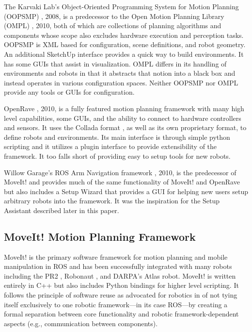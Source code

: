 \documentclass[10pt,journal,compsoc]{joser1}
\begin{document}
{The Karvaki Lab's Object-Oriented Programming System for Motion Planning (OOPSMP) \cite{oopsmp}, 2008, is a predecessor to the Open Motion Planning Library (OMPL) \cite{sucan2012the-open-motion-planning-library}, 2010, both of which are collections of planning algorithms and components whose scope also excludes hardware execution and perception tasks. OOPSMP is XML based for configuration, scene definitions, and robot geometry. An additional SketchUp interface provides a quick way to build environments. It has some GUIs that assist in visualization. OMPL differs in its handling of environments and robots in that it abstracts that notion into a black box and instead operates in various configuration spaces. Neither OOPSMP nor OMPL provide any tools or GUIs for configuration.

OpenRave  \cite{diankov2008openrave}, 2010, is a fully featured motion planning framework with many high level capabilities, some GUIs, and the ability to connect to hardware controllers and sensors. It uses the Collada format \cite{collada}, as well as its own proprietary format, to define robots and environments. Its main interface is through simple python scripting and it utilizes a plugin interface to provide extensibility of the framework. It too falls short of providing easy to setup tools for new robots. 

Willow Garage's ROS Arm Navigation framework \cite{chitta2012perception}, 2010, is the predecessor of MoveIt! and provides much of the same functionality of MoveIt! and OpenRave but also includes a Setup Wizard that provides a GUI for helping new users setup arbitrary robots into the framework. It was the inspiration for the Setup Assistant described later in this paper.
\subsection{MoveIt! Motion Planning Framework}
\label{sec::moveit}

MoveIt!\cite{moveit} is the primary software framework for motion planning and mobile manipulation in ROS and has been successfully integrated with many robots including the PR2 \cite{wyrobek2008towards}, Robonaut \cite{ambrose2000robonaut}, and DARPA's Atlas robot. MoveIt! is written entirely in C++ but also includes Python bindings for higher level scripting. It follows the principle of software reuse as advocated for robotics in \cite{makarenko2007benefits} of not tying itself exclusively to one robotic framework---in its case ROS---by creating a formal separation between core functionality and robotic framework-dependent aspects (e.g., communication between components).

}
\end{document}
